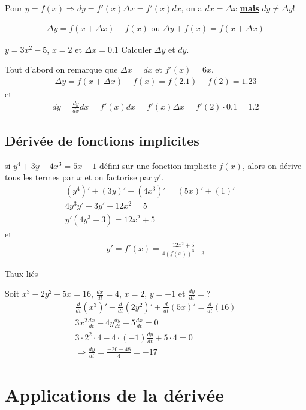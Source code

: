 Pour $y=f(x)\Rightarrow dy=f'(x)\Delta x=f'(x)dx$, on a $dx=\Delta x$ \underline{\textbf{mais}} $dy\neq\Delta y$!

\begin{eqnarray}
	\Delta y=f(x+\Delta x)-f(x)\text{ ou }	\Delta y+f(x)=f(x+\Delta x)
\end{eqnarray}

\begin{myExample}
	$y=3x^2-5$, $x=2$ et $\Delta x=0.1$
	Calculer $\Delta y$ et $dy$.
	
	Tout d'abord on remarque que $\Delta x=dx$ et $f'(x)=6x$.
	\begin{eqnarray*}
		\Delta y=f(x+\Delta x)-f(x)=f(2.1)-f(2)=1.23
	\end{eqnarray*}
	et
	\begin{eqnarray*}
		dy=\frac{dy}{dx}dx=f'(x)dx=f'(x)\Delta x=f'(2)\cdot0.1=1.2
	\end{eqnarray*}
	
\end{myExample}

\section{Dérivée de fonctions implicites}
si $y^4+3y-4x^3=5x+1$ défini sur une fonction implicite $f(x)$, alors on dérive tous les termes par $x$ et on factorise par $y'$.
\begin{eqnarray*}
	(y^4)'+(3y)'-(4x^3)'=(5x)'+(1)'=
	\\
	4y^3y'+3y'-12x^2=5
	\\
	y'(4y^3+3)=12x^2+5
\end{eqnarray*}
et
\begin{eqnarray*}
	y'=f'(x)=\frac{12x^2+5}{4(f(x))^3+3}
\end{eqnarray*}
\begin{myExample}
	Taux liés
	
	Soit $x^3-2y^2+5x=16$, $\frac{dx}{dt}=4$, $x=2$, $y=-1$ et $\frac{dy}{dt}=?$
	\begin{eqnarray*}
		\frac{d}{dt}(x^3)'-\frac{d}{dt}(2y^2)'+\frac{d}{dt}(5x)'=\frac{d}{dt}(16)
		\\
		3x^2\frac{dx}{dt}-4y\frac{dy}{dt}+5\frac{dx}{dt}=0
		\\
		3\cdot2^2\cdot4-4\cdot(-1)\frac{dy}{dt}+5\cdot 4=0
		\\
		\Rightarrow \frac{dy}{dt}=\frac{-20-48}{4}=-17
	\end{eqnarray*}
\end{myExample}
\chapter{Applications de la dérivée}
